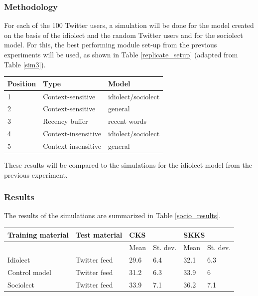 \documentclass[11pt]{article}
\let\originaltable\table
\let\endoriginaltable\endtable
\renewenvironment{table}[1][ht]{%
  \originaltable[#1]
  \centering}%
  {\endoriginaltable}
\begin{document}
\subsubsection{Methodology}

For each of the 100 Twitter users, a simulation will be done for the model created on the basis of the idiolect and the random Twitter users and for the sociolect model. For this, the best performing module set-up from the previous experiments will be used, as shown in Table \ref{replicate_setup} (adapted from Table \ref{sim3}).

\begin{table}[H]
\begin{tabular}{lll} 
Position&Type&Model\\
\hline
1&Context-sensitive&idiolect/sociolect\\
2&Context-sensitive&general\\
3&Recency buffer&recent words\\
4&Context-insensitive&idiolect/sociolect\\
5&Context-insensitive&general\\
\end{tabular} 
\caption{The best performing module set-up} \label{replicate_setup}
\end{table}

These results will be compared to the simulations for the idiolect model from the previous experiment.

\subsubsection{Results}

The results of the simulations are summarized in Table \ref{socio_results}.

\begin{table}[H] 
\centering
\begin{tabular}{ll|llll} 
Training material&Test material&\multicolumn{2}{l}{CKS}&\multicolumn{2}{l}{SKKS}\\
\hline
&&Mean&St. dev.&Mean&St. dev.\\
Idiolect&Twitter feed&29.6&6.4&32.1&6.3\\
Control model&Twitter feed&31.2&6.3&33.9&6\\
Sociolect&Twitter feed&33.9&7.1&36.2&7.1\\
\end{tabular} 
\caption{Mean percentage of keystrokes saved when using an idiolect, a control model (consisting of an idiolect and random other Twitter feeds) and a sociolect.} \label{socio_results}
\end{table}
\end{document}
